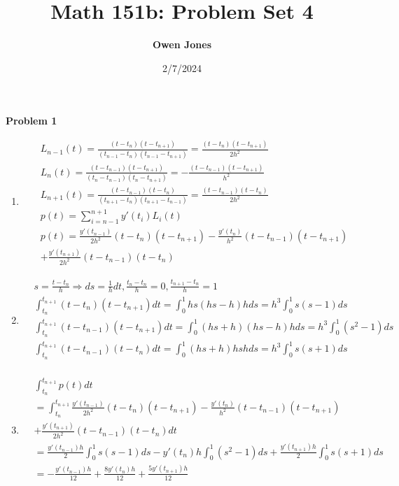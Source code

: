 \documentclass[10pt]{article}
\title{\bf Math 151b: Problem Set 4}
\date{2/7/2024}
\author{\bf Owen Jones}
\begin{document}
\maketitle
\textbf{Problem 1}
\begin{enumerate}[label=(\alph*)]
    \item \begin{align*}
        &L_{n-1}(t)=\frac{(t-t_n)(t-t_{n+1})}{(t_{n-1}-t_n)(t_{n-1}-t_{n+1})}=\frac{(t-t_n)(t-t_{n+1})}{2h^2}\\
        &L_{n}(t)=\frac{(t-t_{n-1})(t-t_{n+1})}{(t_n-t_{n-1})(t_n-t_{n+1})}=-\frac{(t-t_{n-1})(t-t_{n+1})}{h^2}\\
        &L_{n+1}(t)=\frac{(t-t_{n-1})(t-t_n)}{(t_{n+1}-t_n)(t_{n+1}-t_{n-1})}=\frac{(t-t_{n-1})(t-t_n)}{2h^2}\\
        &p(t)=\sum_{i=n-1}^{n+1}y'(t_i)L_i(t)\\
        &p(t)=\frac{y'(t_{n-1})}{2h^2}(t-t_n)(t-t_{n+1})-\frac{y'(t_n)}{h^2}(t-t_{n-1})(t-t_{n+1})\\
        &+\frac{y'(t_{n+1})}{2h^2}(t-t_{n-1})(t-t_n)
        \end{align*}
    \item \begin{align*}
        &s=\frac{t-t_n}{h}\Rightarrow ds=\frac{1}{h}dt, \frac{t_n-t_n}{h}=0,\frac{t_{n+1}-t_n}{h}=1\\
        &\int_{t_n}^{t_{n+1}}(t-t_n)(t-t_{n+1})dt=\int_{0}^{1}hs(hs-h)hds=h^3\int_{0}^{1}s(s-1)ds\\
        &\int_{t_n}^{t_{n+1}}(t-t_{n-1})(t-t_{n+1})dt=\int_{0}^{1}(hs+h)(hs-h)hds=h^3\int_{0}^{1}(s^2-1)ds\\
        &\int_{t_n}^{t_{n+1}}(t-t_{n-1})(t-t_n)dt=\int_{0}^{1}(hs+h)hshds=h^3\int_{0}^{1}s(s+1)ds\\
    \end{align*}
    \item \begin{align*}
        &\int_{t_n}^{t_{n+1}}p(t)dt\\
        &=\int_{t_n}^{t_{n+1}}\frac{y'(t_{n-1})}{2h^2}(t-t_n)(t-t_{n+1})-\frac{y'(t_n)}{h^2}(t-t_{n-1})(t-t_{n+1})\\
        &+\frac{y'(t_{n+1})}{2h^2}(t-t_{n-1})(t-t_n)dt\\
        &=\frac{y'(t_{n-1})h}{2}\int_{0}^{1}s(s-1)ds
        -y'(t_{n})h\int_{0}^{1}(s^2-1)ds
        +\frac{y'(t_{n+1})h}{2}\int_{0}^{1}s(s+1)ds\\
        &=-\frac{y'(t_{n-1})h}{12}+\frac{8y'(t_{n})h}{12}+\frac{5y'(t_{n+1})h}{12}\\

\end{align*}
\end{enumerate}
\end{document}
